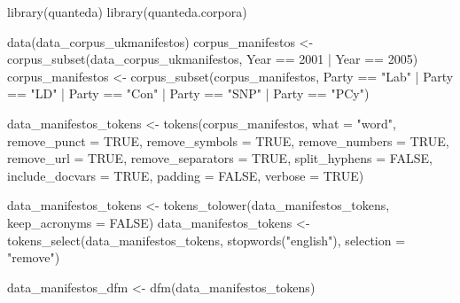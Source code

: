 \documentclass[
]{book}
\newenvironment{Shaded}{\begin{snugshade}}{\end{snugshade}}
\newcommand{\AttributeTok}[1]{\textcolor[rgb]{0.77,0.63,0.00}{#1}}
\newcommand{\ConstantTok}[1]{\textcolor[rgb]{0.00,0.00,0.00}{#1}}
\newcommand{\DecValTok}[1]{\textcolor[rgb]{0.00,0.00,0.81}{#1}}
\newcommand{\FunctionTok}[1]{\textcolor[rgb]{0.00,0.00,0.00}{#1}}
\newcommand{\NormalTok}[1]{#1}
\newcommand{\OtherTok}[1]{\textcolor[rgb]{0.56,0.35,0.01}{#1}}
\newcommand{\SpecialCharTok}[1]{\textcolor[rgb]{0.00,0.00,0.00}{#1}}
\newcommand{\StringTok}[1]{\textcolor[rgb]{0.31,0.60,0.02}{#1}}
\begin{document}
\begin{Shaded}
\begin{Highlighting}[]
\FunctionTok{library}\NormalTok{(quanteda)}
\FunctionTok{library}\NormalTok{(quanteda.corpora)}

\FunctionTok{data}\NormalTok{(data\_corpus\_ukmanifestos)}
\NormalTok{corpus\_manifestos }\OtherTok{\textless{}{-}} \FunctionTok{corpus\_subset}\NormalTok{(data\_corpus\_ukmanifestos,}
\NormalTok{    Year }\SpecialCharTok{==} \DecValTok{2001} \SpecialCharTok{|}\NormalTok{ Year }\SpecialCharTok{==} \DecValTok{2005}\NormalTok{)}
\NormalTok{corpus\_manifestos }\OtherTok{\textless{}{-}} \FunctionTok{corpus\_subset}\NormalTok{(corpus\_manifestos, Party }\SpecialCharTok{==}
    \StringTok{"Lab"} \SpecialCharTok{|}\NormalTok{ Party }\SpecialCharTok{==} \StringTok{"LD"} \SpecialCharTok{|}\NormalTok{ Party }\SpecialCharTok{==} \StringTok{"Con"} \SpecialCharTok{|}\NormalTok{ Party }\SpecialCharTok{==} \StringTok{"SNP"} \SpecialCharTok{|}
\NormalTok{    Party }\SpecialCharTok{==} \StringTok{"PCy"}\NormalTok{)}

\NormalTok{data\_manifestos\_tokens }\OtherTok{\textless{}{-}} \FunctionTok{tokens}\NormalTok{(corpus\_manifestos, }\AttributeTok{what =} \StringTok{"word"}\NormalTok{,}
    \AttributeTok{remove\_punct =} \ConstantTok{TRUE}\NormalTok{, }\AttributeTok{remove\_symbols =} \ConstantTok{TRUE}\NormalTok{, }\AttributeTok{remove\_numbers =} \ConstantTok{TRUE}\NormalTok{,}
    \AttributeTok{remove\_url =} \ConstantTok{TRUE}\NormalTok{, }\AttributeTok{remove\_separators =} \ConstantTok{TRUE}\NormalTok{, }\AttributeTok{split\_hyphens =} \ConstantTok{FALSE}\NormalTok{,}
    \AttributeTok{include\_docvars =} \ConstantTok{TRUE}\NormalTok{, }\AttributeTok{padding =} \ConstantTok{FALSE}\NormalTok{, }\AttributeTok{verbose =} \ConstantTok{TRUE}\NormalTok{)}

\NormalTok{data\_manifestos\_tokens }\OtherTok{\textless{}{-}} \FunctionTok{tokens\_tolower}\NormalTok{(data\_manifestos\_tokens,}
    \AttributeTok{keep\_acronyms =} \ConstantTok{FALSE}\NormalTok{)}
\NormalTok{data\_manifestos\_tokens }\OtherTok{\textless{}{-}} \FunctionTok{tokens\_select}\NormalTok{(data\_manifestos\_tokens,}
    \FunctionTok{stopwords}\NormalTok{(}\StringTok{"english"}\NormalTok{), }\AttributeTok{selection =} \StringTok{"remove"}\NormalTok{)}

\NormalTok{data\_manifestos\_dfm }\OtherTok{\textless{}{-}} \FunctionTok{dfm}\NormalTok{(data\_manifestos\_tokens)}
\end{Highlighting}
\end{Shaded}
\end{document}
